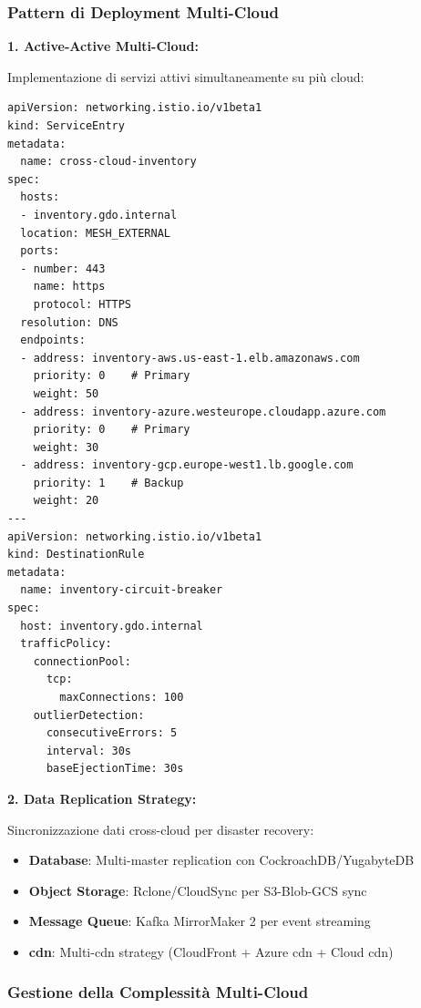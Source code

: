 \subsubsection{\texorpdfstring{\textbf{Pattern di Deployment Multi-Cloud}}{3.4.2.2 - Pattern di Deployment Multi-Cloud}}

\textbf{1. Active-Active Multi-Cloud:}

Implementazione di servizi attivi simultaneamente su più cloud:

\begin{lstlisting}[caption={\gls{kubernetes} Multi-Cloud Service},label={lst:multicloud_k8s}]
apiVersion: networking.istio.io/v1beta1
kind: ServiceEntry
metadata:
  name: cross-cloud-inventory
spec:
  hosts:
  - inventory.gdo.internal
  location: MESH_EXTERNAL
  ports:
  - number: 443
    name: https
    protocol: HTTPS
  resolution: DNS
  endpoints:
  - address: inventory-aws.us-east-1.elb.amazonaws.com
    priority: 0    # Primary
    weight: 50
  - address: inventory-azure.westeurope.cloudapp.azure.com
    priority: 0    # Primary
    weight: 30
  - address: inventory-gcp.europe-west1.lb.google.com
    priority: 1    # Backup
    weight: 20
---
apiVersion: networking.istio.io/v1beta1
kind: DestinationRule
metadata:
  name: inventory-circuit-breaker
spec:
  host: inventory.gdo.internal
  trafficPolicy:
    connectionPool:
      tcp:
        maxConnections: 100
    outlierDetection:
      consecutiveErrors: 5
      interval: 30s
      baseEjectionTime: 30s
\end{lstlisting}

\textbf{2. Data Replication Strategy:}

Sincronizzazione dati cross-cloud per disaster recovery:

\begin{itemize}
    \item \textbf{Database}: Multi-master replication con CockroachDB/YugabyteDB
    \item \textbf{Object Storage}: Rclone/CloudSync per S3-Blob-GCS sync
    \item \textbf{Message Queue}: Kafka MirrorMaker 2 per event streaming
    \item \textbf{\gls{cdn}}: Multi-\gls{cdn} strategy (CloudFront + Azure \gls{cdn} + Cloud \gls{cdn})
\end{itemize}

\subsubsection{\texorpdfstring{\textbf{Gestione della Complessità Multi-Cloud}}{3.4.2.3 - Gestione della Complessità Multi-Cloud}}


